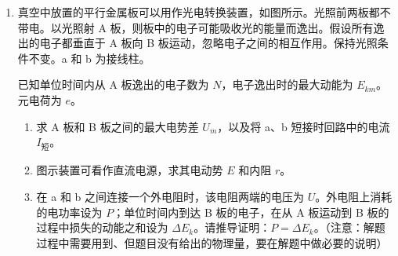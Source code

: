 \documentclass[\gkver]{gaokaozhenti}
\begin{document}
\begin{enumerate}
\item
真空中放置的平行金属板可以用作光电转换装置，如图所示。光照前两板都不带电。以光照射 A 板，则板中的电子可能吸收光的能量而逸出。假设所有逸出的电子都垂直于 A 板向 B 板运动，忽略电子之间的相互作用。保持光照条件不变。a 和 b 为接线柱。

已知单位时间内从 A 板逸出的电子数为 $N$，电子逸出时的最大动能为 $E_{km}$。元电荷为 $e$。

\begin{enumerate}
	\item
	求 A 板和 B 板之间的最大电势差 $U_{m}$，以及将 a、b 短接时回路中的电流 $I_{\text{短}}$。
	\item
	图示装置可看作直流电源，求其电动势 $E$ 和内阻 $r$。
	\item
	在 a 和 b 之间连接一个外电阻时，该电阻两端的电压为 $U$。外电阻上消耗的电功率设为 $P$；单位时间内到达 B 板的电子，在从 A 板运动到 B 板的过程中损失的动能之和设为 $\Delta E_{k}$。请推导证明：$P=\Delta E_{k}$。（注意：解题过程中需要用到、但题目没有给出的物理量，要在解题中做必要的说明）
\end{enumerate}



\end{enumerate}
\end{document}
